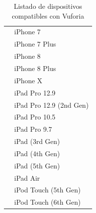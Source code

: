 \begin{table}[]
\begin{tabular}{| p{4.5cm} | p{10.5cm} |}
		& iPhone 7   \\ \cline{2-2}
		& iPhone 7 Plus   \\ \cline{2-2}
		& iPhone 8    \\ \cline{2-2}
		& iPhone 8 Plus   \\ \cline{2-2}
		& iPhone X   \\ \cline{2-2}
		& iPad Pro 12.9   \\ \cline{2-2}
		& iPad Pro 12.9 (2nd Gen)   \\ \cline{2-2}
		& iPad Pro 10.5   \\ \cline{2-2}
		& iPad Pro 9.7   \\ \cline{2-2}
		& iPad (3rd Gen)   \\ \cline{2-2}
		& iPad (4th Gen)   \\ \cline{2-2}
		& iPad (5th Gen)  \\  \cline{2-2}
		& iPad Air   \\ \cline{2-2}
		& iPod Touch (5th Gen)   \\ \cline{2-2}
		& iPod Touch (6th Gen)   \\ \hline 
	\end{tabular}
	\captionsetup{justification=centering}
	\caption{Listado de dispositivos compatibles con Vuforia}
\end{table}
\newpage
